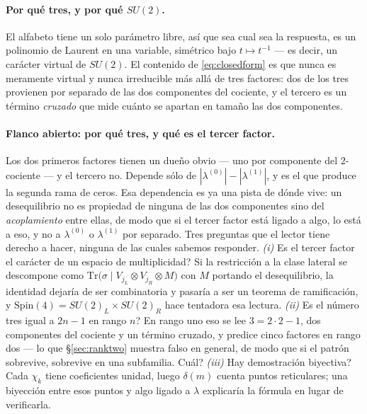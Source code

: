 \documentclass[11pt,a4paper]{article}
\begin{document}
\paragraph{Por qu\'e tres, y por qu\'e $SU(2)$.} El alfabeto tiene un solo par\'ametro libre,
as\'i que sea cual sea la respuesta, es un polinomio de Laurent en una variable, sim\'etrico
bajo $t\mapsto t^{-1}$ --- es decir, un car\'acter virtual de $SU(2)$. El contenido de
\eqref{eq:closedform} es que nunca es meramente virtual y nunca irreducible m\'as all\'a de
tres factores: dos de los tres provienen por separado de las dos componentes del cociente, y el
tercero es un t\'ermino \emph{cruzado} que mide cu\'anto se apartan en tama\~no las dos
componentes.

\paragraph{Flanco abierto: por qu\'e tres, y qu\'e es el tercer factor.} Los dos primeros
factores tienen un due\~no obvio --- uno por componente del $2$-cociente --- y el tercero no.
Depende s\'olo de $|\lambda^{(0)}|-|\lambda^{(1)}|$, y es el que produce la segunda rama de
ceros. Esa dependencia es ya una pista de d\'onde vive: un desequilibrio no es propiedad de
ninguna de las dos componentes sino del \emph{acoplamiento} entre ellas, de modo que si el
tercer factor est\'a ligado a algo, lo est\'a a eso, y no a $\lambda^{(0)}$ o
$\lambda^{(1)}$ por separado. Tres preguntas que el lector tiene derecho a hacer, ninguna de las cuales sabemos
responder.
\emph{(i)} \textquestiondown Es el tercer factor el car\'acter de un espacio de multiplicidad?
Si la restricci\'on a la clase lateral se descompone como
$\mathrm{Tr}\big(\sigma\mid V_{j_L}\otimes V_{j_R}\otimes M\big)$ con $M$ portando el
desequilibrio, la identidad dejar\'ia de ser combinatoria y pasar\'ia a ser un teorema de
ramificaci\'on, y $\mathrm{Spin}(4)=SU(2)_L\times SU(2)_R$ hace tentadora esa lectura.
\emph{(ii)} \textquestiondown Es el n\'umero tres igual a $2n-1$ en rango $n$? En rango uno eso
se lee $3=2\cdot2-1$, dos componentes del cociente y un t\'ermino cruzado, y predice cinco
factores en rango dos --- lo que \S\ref{sec:ranktwo} muestra falso en general, de modo que si
el patr\'on sobrevive, sobrevive en una subfamilia. \textquestiondown Cu\'al?
\emph{(iii)} \textquestiondown Hay demostraci\'on biyectiva? Cada $\chi_k$ tiene coeficientes
unidad, luego $\delta(m)$ cuenta puntos reticulares; una biyecci\'on entre esos puntos y algo
ligado a $\lambda$ explicar\'ia la f\'ormula en lugar de verificarla.
\end{document}
